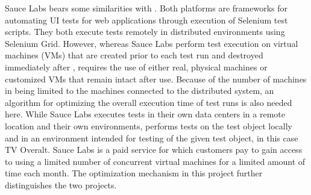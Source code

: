 Sauce Labs bears some similarities with \toolname. Both platforms are frameworks for automating UI tests for web applications through execution of Selenium test scripts. They both execute tests remotely in distributed environments using Selenium Grid. However, whereas Sauce Labs perform test execution on virtual machines (VMs) that are created prior to each test run and destroyed immediately after \cite{SauceLabsFeatures}, \toolname \space requires the use of either real, physical machines or customized VMs that remain intact after use. Because of the number of machines in \toolname \space being limited to the machines connected to the distributed system, an algorithm for optimizing the overall execution time of test runs is also needed here. While Sauce Labs executes tests in their own data centers in a remote location and their own environments, \toolname \space performs tests on the test object locally and in an environment intended for testing of the given test object, in this case TV Overalt. Sauce Labs is a paid service for which customers pay to gain access to using a limited number of concurrent virtual machines for a limited amount of time each month. The optimization mechanism in this project further distinguishes the two projects.

